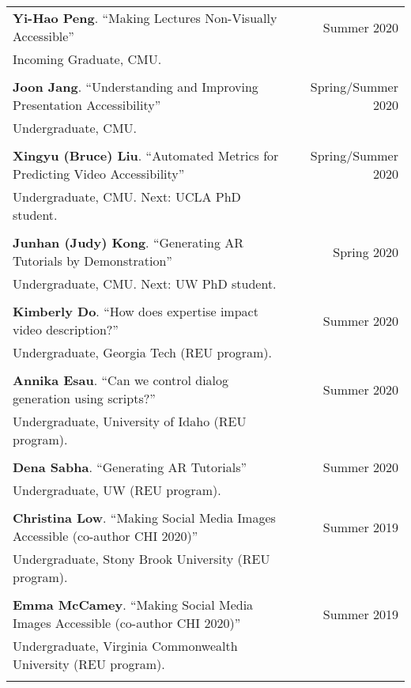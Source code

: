 \begin{longtable}{Xr}
	\textbf{Yi-Hao Peng}. ``Making Lectures Non-Visually Accessible'' & Summer 2020 \\
	Incoming Graduate, CMU. &  \\
	\\

	\textbf{Joon Jang}. ``Understanding and Improving Presentation Accessibility'' & Spring/Summer 2020 \\
	Undergraduate, CMU. &  \\
	\\

	\textbf{Xingyu (Bruce) Liu}. ``Automated Metrics for Predicting Video Accessibility'' & Spring/Summer 2020 \\
	Undergraduate, CMU. Next: UCLA PhD student. &  \\
	\\

	\textbf{Junhan (Judy) Kong}. ``Generating AR Tutorials by Demonstration'' & Spring 2020 \\
	Undergraduate, CMU. Next: UW PhD student. &  \\
	\\

	\textbf{Kimberly Do}. ``How does expertise impact video description?'' & Summer 2020 \\
	Undergraduate, Georgia Tech (REU program). &  \\
	\\

	\textbf{Annika Esau}. ``Can we control dialog generation using scripts?'' & Summer 2020 \\
	Undergraduate, University of Idaho (REU program). &  \\
	\\

	\textbf{Dena Sabha}. ``Generating AR Tutorials'' & Summer 2020 \\
	Undergraduate, UW (REU program). &  \\
	\\

	\textbf{Christina Low}. ``Making Social Media Images Accessible (co-author CHI 2020)'' & Summer 2019 \\
	Undergraduate, Stony Brook University (REU program). &  \\
	\\

	\textbf{Emma McCamey}. ``Making Social Media Images Accessible (co-author CHI 2020)'' & Summer 2019 \\
	Undergraduate, Virginia Commonwealth University (REU program). &  \\
	\\


\end{longtable}
